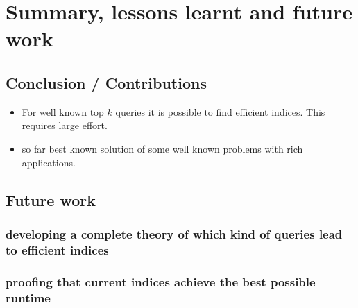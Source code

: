\documentclass[•]{book}
\begin{document}
\part{Summary, lessons learnt and future work}

\chapter{Conclusion / Contributions}
\begin{itemize}
\item For well known top $k$ queries it is possible to find efficient indices. This requires large effort. 
\item so far best known solution of some well known problems with rich applications. 
\end{itemize}
\chapter{Future work}
\section{developing a complete theory of which kind of queries lead to efficient indices}
\section{proofing that current indices achieve the best possible runtime}



\end{document}
